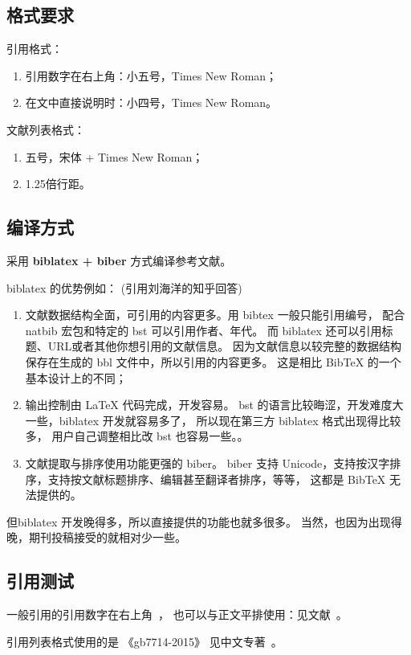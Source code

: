 \subsection{格式要求}

引用格式：

\begin{enumerate}
	\item 引用数字在右上角：小五号，Times New Roman；
	\item 在文中直接说明时：小四号，Times New Roman。
\end{enumerate}

文献列表格式：

\begin{enumerate}
	\item 五号，宋体 + Times New Roman；
	\item 1.25倍行距。
\end{enumerate}

\subsection{编译方式}

采用 \textbf{biblatex + biber} 方式编译参考文献。

biblatex 的优势例如： (引用刘海洋的知乎回答)

\begin{enumerate}
	\item 文献数据结构全面，可引用的内容更多。用 bibtex 一般只能引用编号，
				配合 natbib 宏包和特定的 bst 可以引用作者、年代。
				而 biblatex 还可以引用标题、URL或者其他你想引用的文献信息。
				因为文献信息以较完整的数据结构保存在生成的 bbl 文件中，所以引用的内容更多。
				这是相比 BibTeX 的一个基本设计上的不同；
	\item 输出控制由 LaTeX 代码完成，开发容易。
				bst 的语言比较晦涩，开发难度大一些，biblatex 开发就容易多了，
				所以现在第三方 biblatex 格式出现得比较多，
				用户自己调整相比改 bst 也容易一些。。
	\item 文献提取与排序使用功能更强的 biber。
				biber 支持 Unicode，支持按汉字排序，支持按文献标题排序、编辑甚至翻译者排序，等等，
				这都是 BibTeX 无法提供的。
\end{enumerate}

但biblatex 开发晚得多，所以直接提供的功能也就多很多。
当然，也因为出现得晚，期刊投稿接受的就相对少一些。

\subsection{引用测试}

一般引用的引用数字在右上角~\cite{knuth1984}，
也可以与正文平排使用：见文献~\parencite{knuth1986}。

引用列表格式使用的是 《gb7714-2015》
见中文专著~\cite{liu2013}。
